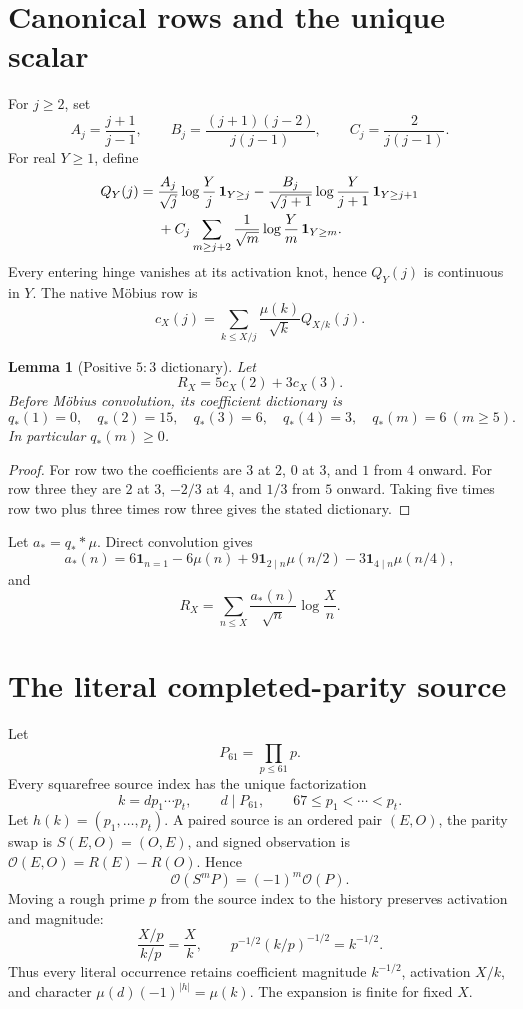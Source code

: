\documentclass[11pt]{article}
\newtheorem{lemma}[theorem]{Lemma}
\newcommand{\1}{\mathbf 1}
\newcommand{\Obs}{\mathcal O}
\begin{document}
\section{Canonical rows and the unique scalar}

For $j\ge2$, set
\[
 A_j=\frac{j+1}{j-1},\qquad
 B_j=\frac{(j+1)(j-2)}{j(j-1)},\qquad
 C_j=\frac2{j(j-1)}.
\]
For real $Y\ge1$, define
\begin{align}
Q_Y(j)={}&\frac{A_j}{\sqrt j}\log\frac Yj\,\1_{Y\ge j}
-\frac{B_j}{\sqrt{j+1}}\log\frac Y{j+1}\,\1_{Y\ge j+1}\notag\\
&+C_j\sum_{m\ge j+2}\frac1{\sqrt m}\log\frac Ym\,\1_{Y\ge m}.
\end{align}
Every entering hinge vanishes at its activation knot, hence $Q_Y(j)$ is continuous in $Y$. The native M\"obius row is
\[
 c_X(j)=\sum_{k\le X/j}\frac{\mu(k)}{\sqrt k}Q_{X/k}(j).
\]

\begin{lemma}[Positive $5{:}3$ dictionary]\label{lem:dictionary}
Let
\[
 R_X=5c_X(2)+3c_X(3).
\]
Before M\"obius convolution, its coefficient dictionary is
\[
 q_*(1)=0,\quad q_*(2)=15,\quad q_*(3)=6,\quad q_*(4)=3,\quad q_*(m)=6\ (m\ge5).
\]
In particular $q_*(m)\ge0$.
\end{lemma}
\begin{proof}
For row two the coefficients are $3$ at $2$, $0$ at $3$, and $1$ from $4$ onward. For row three they are $2$ at $3$, $-2/3$ at $4$, and $1/3$ from $5$ onward. Taking five times row two plus three times row three gives the stated dictionary.
\end{proof}

Let $a_*=q_* *\mu$. Direct convolution gives
\[
 a_*(n)=6\1_{n=1}-6\mu(n)+9\1_{2\mid n}\mu(n/2)-3\1_{4\mid n}\mu(n/4),
\]
and
\[
 R_X=\sum_{n\le X}\frac{a_*(n)}{\sqrt n}\log\frac Xn.
\]

\section{The literal completed-parity source}

Let
\[
 P_{61}=\prod_{p\le61}p.
\]
Every squarefree source index has the unique factorization
\[
 k=d p_1\cdots p_t,\qquad d\mid P_{61},\qquad67\le p_1<\cdots<p_t.
\]
Let $h(k)=(p_1,\ldots,p_t)$. A paired source is an ordered pair $(E,O)$, the parity swap is $S(E,O)=(O,E)$, and signed observation is $\Obs(E,O)=R(E)-R(O)$. Hence
\[
 \Obs(S^mP)=(-1)^m\Obs(P).
\]
Moving a rough prime $p$ from the source index to the history preserves activation and magnitude:
\[
 \frac{X/p}{k/p}=\frac Xk,\qquad p^{-1/2}(k/p)^{-1/2}=k^{-1/2}.
\]
Thus every literal occurrence retains coefficient magnitude $k^{-1/2}$, activation $X/k$, and character $\mu(d)(-1)^{|h|}=\mu(k)$. The expansion is finite for fixed $X$.
\end{document}
